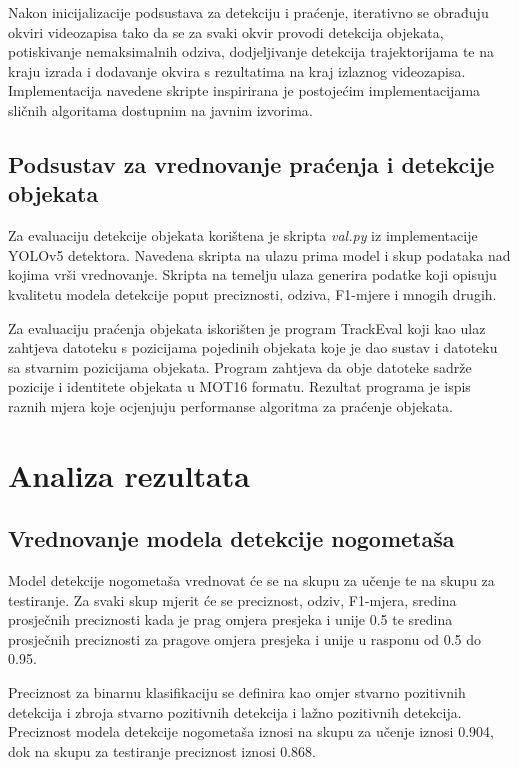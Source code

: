 \documentclass[times, utf8, seminar, numeric]{fer}
\begin{document}
Nakon inicijalizacije podsustava za detekciju i praćenje, iterativno se obrađuju okviri videozapisa tako da se za svaki okvir provodi detekcija objekata, potiskivanje nemaksimalnih odziva, dodjeljivanje detekcija trajektorijama te na kraju izrada i dodavanje okvira s rezultatima na kraj izlaznog videozapisa.
Implementacija navedene skripte inspirirana je postojećim implementacijama sličnih algoritama dostupnim na javnim izvorima\cite{yolov5-deepsort-osnet-2022}\cite{yolov4-deepsort}.
\section{Podsustav za vrednovanje praćenja i detekcije objekata}

Za evaluaciju detekcije objekata korištena je skripta \textit{val.py} iz implementacije YOLOv5 detektora. Navedena skripta na ulazu prima model i skup podataka nad kojima vrši vrednovanje. Skripta na temelju ulaza generira podatke koji opisuju kvalitetu modela detekcije poput preciznosti, odziva, F1-mjere i mnogih drugih.

Za evaluaciju praćenja objekata iskorišten je program TrackEval \cite{MOT16}\cite{luiten2020trackeval}\cite{luiten2020IJCV}\cite{dendorfer2020motchallenge} koji kao ulaz zahtjeva datoteku s pozicijama pojedinih objekata koje je dao sustav i datoteku sa stvarnim pozicijama objekata. Program zahtjeva da obje datoteke sadrže pozicije i identitete objekata u MOT16 formatu.
Rezultat programa je ispis raznih mjera koje ocjenjuju performanse algoritma za praćenje objekata.


\chapter{Analiza rezultata}
\section{Vrednovanje modela detekcije nogometaša}

Model detekcije nogometaša vrednovat će se na skupu za učenje te na skupu za testiranje. Za svaki skup mjerit će se preciznost, odziv, F1-mjera, sredina prosječnih preciznosti kada je prag omjera presjeka i unije 0.5 te sredina prosječnih preciznosti za pragove omjera presjeka i unije u rasponu od 0.5 do 0.95.

Preciznost za binarnu klasifikaciju se definira kao omjer stvarno pozitivnih detekcija i zbroja stvarno pozitivnih detekcija i lažno pozitivnih detekcija. Preciznost modela detekcije nogometaša iznosi na skupu za učenje iznosi 0.904, dok na skupu za testiranje preciznost iznosi  0.868.
\end{document}
